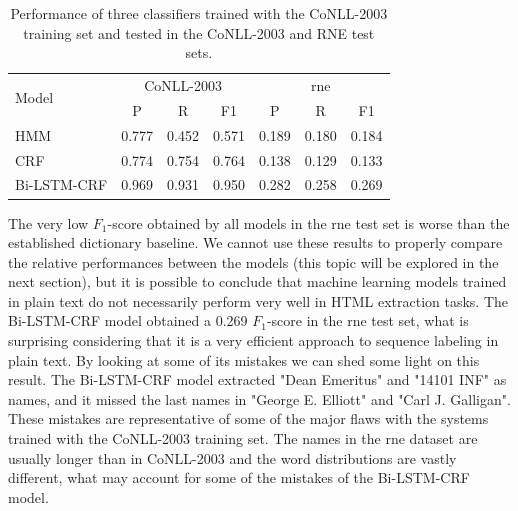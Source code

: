 \documentclass{nle}
\begin{document}
\begin{table}[h]
  \small
  \begin{center}
    \begin{tabular}{ lllllll }
      \toprule
      \multirow{2}{*}{Model} & \multicolumn{3}{c}{CoNLL-2003} & \multicolumn{3}{c}{\gls{rne}} \\
                             & \multicolumn{1}{c}{P} & \multicolumn{1}{c}{R} & \multicolumn{1}{c}{F1}
                             & \multicolumn{1}{c}{P} & \multicolumn{1}{c}{R} & \multicolumn{1}{c}{F1} \\
      \midrule
      HMM         & 0.777 & 0.452 & 0.571 & 0.189 & 0.180 & 0.184 \\
      CRF         & 0.774 & 0.754 & 0.764 & 0.138 & 0.129 & 0.133 \\
      Bi-LSTM-CRF & 0.969 & 0.931 & 0.950 & 0.282 & 0.258 & 0.269 \\
      \bottomrule
    \end{tabular}
  \end{center}
  \caption{
    Performance of three classifiers trained with the {CoNLL-2003} training set and tested in
    the CoNLL-2003 and RNE test sets.
  }
  \label{tab:conll_to_ner_on_html}
\end{table}

The very low $ F_1 $-score obtained by all models in the \gls{rne} test set is worse than the established
dictionary baseline. We cannot use these results to properly compare the relative performances 
between the models (this topic will be explored in the next section), but it is possible to conclude
that machine learning models trained in plain text do not necessarily perform very well in HTML 
extraction tasks. The Bi-LSTM-CRF model obtained a 0.269 $ F_1 $-score in the \gls{rne} test
set, what is surprising considering that it is a very efficient approach to sequence labeling in plain 
text. By looking at some of its mistakes we can shed some light on this result. The Bi-LSTM-CRF model
extracted "Dean Emeritus" and "14101 INF" as names, and it missed the last names in "George E. Elliott"
and "Carl J. Galligan". These mistakes are representative of some of the major flaws with the systems
trained with the CoNLL-2003 training set. The names in the \gls{rne} dataset 
are usually longer than in CoNLL-2003 and the word distributions are vastly different, what may
account for some of the mistakes of the Bi-LSTM-CRF model.
\end{document}
